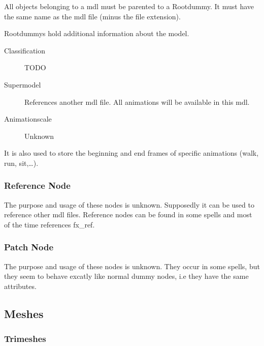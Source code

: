 All objects belonging to a mdl must be parented to a Rootdummy. It must have
the same name as the mdl file (minus the file extension).

Rootdummys hold additional information about the model.
\begin{description}
    \item[Classification] TODO
    \item[Supermodel] References another mdl file. All animations will be available in this mdl.
    \item[Animationscale] Unknown
\end{description}
It is also used to store the beginning and end frames of specific animations
(walk, run, sit,\ldots).

\subsubsection{Reference Node}
The purpose and usage of these nodes is unknown. Supposedly it can be used to
reference other mdl files. Reference nodes can be found in some spells and
most of the time references fx\_ref.

\subsubsection{Patch Node}
The purpose and usage of these nodes is unknown. They occur in some spells, but
they seem to behave excatly like normal dummy nodes, i.e they have the same
attributes.

\subsection{Meshes}

\subsubsection{Trimeshes}

